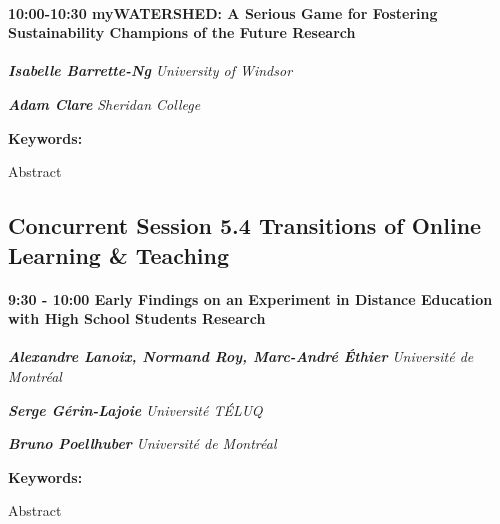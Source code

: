 \documentclass[
]{book}
\begin{document}
\begin{session}
\hypertarget{mywatershed-a-serious-game-for-fostering-sustainability-champions-of-the-future-research}{%
\paragraph*{\texorpdfstring{10:00-10:30 \textbar{} \textbf{myWATERSHED:
A Serious Game for Fostering Sustainability Champions of the Future}
\textbar{}
Research}{10:00-10:30 \textbar{} myWATERSHED: A Serious Game for Fostering Sustainability Champions of the Future \textbar{} Research}}\label{mywatershed-a-serious-game-for-fostering-sustainability-champions-of-the-future-research}}

\textbf{\emph{Isabelle Barrette-Ng}} \textbar{} \emph{University of
Windsor}

\textbf{\emph{Adam Clare}} \textbar{} \emph{Sheridan College}

\textbf{Keywords:}

Abstract
\end{session}

\hypertarget{concurrent-session-5.4-transitions-of-online-learning-teaching}{%
\subsection*{Concurrent Session 5.4 \textbar{} Transitions of Online Learning \& Teaching}\label{concurrent-session-5.4-transitions-of-online-learning-teaching}}

\begin{session}
\hypertarget{early-findings-on-an-experiment-in-distance-education-with-high-school-students-research}{%
\paragraph*{\texorpdfstring{9:30 - 10:00 \textbar{} \textbf{Early
Findings on an Experiment in Distance Education with High School
Students} \textbar{}
Research}{9:30 - 10:00 \textbar{} Early Findings on an Experiment in Distance Education with High School Students \textbar{} Research}}\label{early-findings-on-an-experiment-in-distance-education-with-high-school-students-research}}

\textbf{\emph{Alexandre Lanoix, Normand Roy, Marc-André Éthier}}
\textbar{} \emph{Université de Montréal}

\textbf{\emph{Serge Gérin-Lajoie}} \textbar{} \emph{Université TÉLUQ}

\textbf{\emph{Bruno Poellhuber}} \textbar{} \emph{Université de
Montréal}

\textbf{Keywords:}

Abstract
\end{session}
\end{document}
